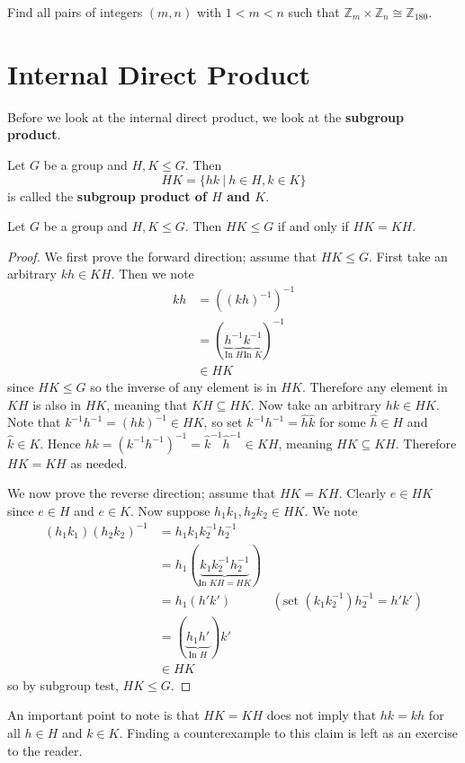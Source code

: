 \begin{exercise}
    Find all pairs of integers $(m, n)$ with $1 < m < n$ such that $\mathbb{Z}_m \times \mathbb{Z}_n \cong \mathbb{Z}_{180}$.
\end{exercise}

\section{Internal Direct Product}
Before we look at the internal direct product, we look at the \textbf{subgroup product}.
\begin{definition}
    Let $G$ be a group and $H, K \leq G$. Then
    \[
        HK = \{hk \ | \ h \in H, k \in K\}
    \]
    is called the \textbf{subgroup product of $H$ and $K$}.
\end{definition}

\begin{proposition}\label{prop-subgroup-product-is-subgroup}
    Let $G$ be a group and $H, K \leq G$. Then $HK \leq G$ if and only if $HK = KH$.
\end{proposition}
\begin{proof}
    We first prove the forward direction; assume that $HK \leq G$. First take an arbitrary $kh \in KH$. Then we note
    \begin{align*}
        kh &= \left(\left(kh\right)^{-1}\right)^{-1}\\
        &= (\underbrace{h^{-1}}_{\text{In } H}\underbrace{k^{-1}}_{\text{In } K})^{-1}\\
        &\in HK
    \end{align*}
    since $HK \leq G$ so the inverse of any element is in $HK$. Therefore any element in $KH$ is also in $HK$, meaning that $KH \subseteq HK$. Now take an arbitrary $hk \in HK$. Note that $k^{-1}h^{-1} = (hk)^{-1} \in HK$, so set $k^{-1}h^{-1} = \hat{h}\hat{k}$ for some $\hat{h} \in H$ and $\hat{k} \in K$. Hence $hk = \left(k^{-1}h^{-1}\right)^{-1} = \hat{k}^{-1}\hat{h}^{-1} \in KH$, meaning $HK \subseteq KH$. Therefore $HK = KH$ as needed.

    We now prove the reverse direction; assume that $HK = KH$. Clearly $e \in HK$ since $e \in H$ and $e \in K$. Now suppose $h_1k_1, h_2k_2 \in HK$. We note
    \begin{align*}
        (h_1k_1)(h_2k_2)^{-1} &= h_1k_1k_2^{-1}h_2^{-1}\\
        &= h_1(\underbrace{k_1k_2^{-1}h_2^{-1}}_{\text{In } KH = HK})\\
        &= h_1(h'k') & (\text{set }(k_1k_2^{-1})h_2^{-1} = h'k')\\
        &= (\underbrace{h_1h'}_{\text{In } H})k'\\
        &\in HK
    \end{align*}
    so by subgroup test, $HK \leq G$.
\end{proof}
An important point to note is that $HK = KH$ does not imply that $hk = kh$ for all $h \in H$ and $k \in K$. Finding a counterexample to this claim is left as an exercise to the reader.

